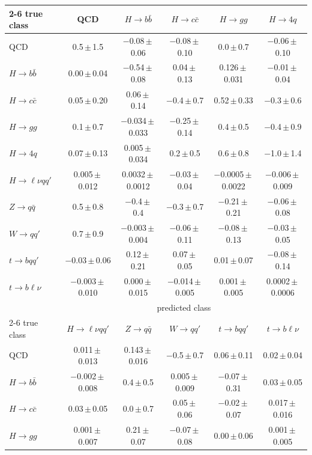 \begin{landscape}
{\begin{center}
\begin{minipage}{\linewidth}
\begin{tabular*}{\linewidth}{@{\extracolsep{\fill}}lccccc@{}}
\cmidrule(lr){2-6}
true class & QCD & $H\to b\bar b$ & $H\to c\bar c$ & $H\to gg$ & $H\to 4q$ \\
\midrule
QCD & 0.5\,$\pm$\,1.5 & $-$0.08\,$\pm$\,0.06 & $-$0.08\,$\pm$\,0.10 & 0.0\,$\pm$\,0.7 & $-$0.06\,$\pm$\,0.10 \\
$H\to b\bar b$ & 0.00\,$\pm$\,0.04 & $-$0.54\,$\pm$\,0.08 & 0.04\,$\pm$\,0.13 & 0.126\,$\pm$\,0.031 & $-$0.01\,$\pm$\,0.04 \\
$H\to c\bar c$ & 0.05\,$\pm$\,0.20 & 0.06\,$\pm$\,0.14 & $-$0.4\,$\pm$\,0.7 & 0.52\,$\pm$\,0.33 & $-$0.3\,$\pm$\,0.6 \\
$H\to gg$ & 0.1\,$\pm$\,0.7 & $-$0.034\,$\pm$\,0.033 & $-$0.25\,$\pm$\,0.14 & 0.4\,$\pm$\,0.5 & $-$0.4\,$\pm$\,0.9 \\
$H\to 4q$ & 0.07\,$\pm$\,0.13 & 0.005\,$\pm$\,0.034 & 0.2\,$\pm$\,0.5 & 0.6\,$\pm$\,0.8 & $-$1.0\,$\pm$\,1.4 \\
$H\to \ell\nu qq'$ & 0.005\,$\pm$\,0.012 & 0.0032\,$\pm$\,0.0012 & $-$0.03\,$\pm$\,0.04 & $-$0.0005\,$\pm$\,0.0022 & $-$0.006\,$\pm$\,0.009 \\
$Z\to q\bar q$ & 0.5\,$\pm$\,0.8 & $-$0.4\,$\pm$\,0.4 & $-$0.3\,$\pm$\,0.7 & $-$0.21\,$\pm$\,0.21 & $-$0.06\,$\pm$\,0.08 \\
$W\to qq'$ & 0.7\,$\pm$\,0.9 & $-$0.003\,$\pm$\,0.004 & $-$0.06\,$\pm$\,0.11 & $-$0.08\,$\pm$\,0.13 & $-$0.03\,$\pm$\,0.05 \\
$t\to bqq'$ & $-$0.03\,$\pm$\,0.06 & 0.12\,$\pm$\,0.21 & 0.07\,$\pm$\,0.05 & 0.01\,$\pm$\,0.07 & $-$0.08\,$\pm$\,0.14 \\
$t\to b\ell\nu$ & $-$0.003\,$\pm$\,0.010 & 0.000\,$\pm$\,0.015 & $-$0.014\,$\pm$\,0.005 & 0.001\,$\pm$\,0.005 & 0.0002\,$\pm$\,0.0006 \\
\midrule
 & \multicolumn{5}{c}{predicted class} \\
\cmidrule(lr){2-6}
true class & $H\to \ell\nu qq'$ & $Z\to q\bar q$ & $W\to qq'$ & $t\to bqq'$ & $t\to b\ell\nu$ \\
\midrule
QCD & 0.011\,$\pm$\,0.013 & 0.143\,$\pm$\,0.016 & $-$0.5\,$\pm$\,0.7 & 0.06\,$\pm$\,0.11 & 0.02\,$\pm$\,0.04 \\
$H\to b\bar b$ & $-$0.002\,$\pm$\,0.008 & 0.4\,$\pm$\,0.5 & 0.005\,$\pm$\,0.009 & $-$0.07\,$\pm$\,0.31 & 0.03\,$\pm$\,0.05 \\
$H\to c\bar c$ & 0.03\,$\pm$\,0.05 & 0.0\,$\pm$\,0.7 & 0.05\,$\pm$\,0.06 & $-$0.02\,$\pm$\,0.07 & 0.017\,$\pm$\,0.016 \\
$H\to gg$ & 0.001\,$\pm$\,0.007 & 0.21\,$\pm$\,0.07 & $-$0.07\,$\pm$\,0.08 & 0.00\,$\pm$\,0.06 & 0.001\,$\pm$\,0.005 \\

\end{tabular*}
\end{minipage}
\end{center}}
\end{landscape}

